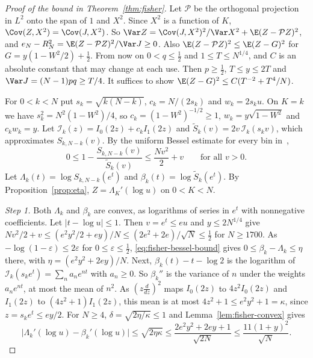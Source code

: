 \begin{proof}[Proof of the bound in Theorem~\ref{thm:fisher}]
Let $\mathcal P$ be the orthogonal projection in $L^2$ onto the span of $1$
and $X^2$. Since $X^2$ is a function of $K$, $\Cov(Z,X^2)=\Cov(J,X^2)$. So
$\Var Z=\Cov(J,X^2)^2/\Var X^2+\E(Z-\mathcal PZ)^2$, and
$e_N-R^2_N=\E(Z-\mathcal PZ)^2/\Var J\ge0$. Also
$\E(Z-\mathcal PZ)^2\le\E(Z-G)^2$ for $G=y(1-W^2/2)+\frac12$. From now on
$0<q\le\frac12$ and $1\le T\le N^{1/4}$, and $C$ is an absolute constant that
may change at each use. Then $p\ge\frac12$, $T\le y\le2T$ and
$\Var J=(N-1)pq\ge T/4$. It suffices to show
$\E(Z-G)^2\le C(T^{-2}+T^4/N)$.

For $0<k<N$ put $s_k=\sqrt{k(N-k)}$, $c_k=N/(2s_k)$ and $w_k=2s_ku$. On
$K=k$ we have $s_k^2=N^2(1-W^2)/4$, so $c_k=(1-W^2)^{-1/2}\ge1$,
$w_k=y\sqrt{1-W^2}$ and $c_kw_k=y$. Let $\mathcal I_k(z)=I_0(2z)+c_kI_1(2z)$
and $\widetilde S_k(v)=2v\,\mathcal I_k(s_kv)$, which approximates
$S_{k,N-k}(v)$. By the uniform Bessel estimate for every
bin in~\cite{paperA},
\begin{equation}\label{eq:fisher-bessel-bound}
 0\le1-\frac{S_{k,N-k}(v)}{\widetilde S_k(v)}\le\frac{Nv^2}2+v
 \qquad\text{for all }v>0 .
\end{equation}
Let $\Lambda_k(t)=\log S_{k,N-k}(e^t)$ and
$\beta_k(t)=\log\widetilde S_k(e^t)$. By Proposition~\ref{prop:eta},
$Z=\Lambda_K'(\log u)$ on $0<K<N$.

\emph{Step 1.} Both $\Lambda_k$ and $\beta_k$ are convex, as logarithms of
series in $e^t$ with nonnegative coefficients. Let $|t-\log
u|\le1$. Then $v=e^t\le eu$ and $y\le2N^{1/4}$ give
$Nv^2/2+v\le(e^2y^2/2+ey)/N\le(2e^2+2e)/\sqrt N\le\frac12$ for $N\ge1700$. As
$-\log(1-\varepsilon)\le2\varepsilon$ for $0\le\varepsilon\le\frac12$,
\eqref{eq:fisher-bessel-bound} gives $0\le\beta_k-\Lambda_k\le\eta$ there,
with $\eta=(e^2y^2+2ey)/N$. Next, $\beta_k(t)-t-\log2$ is the logarithm of
$\mathcal I_k(s_ke^t)=\sum_na_ne^{nt}$ with $a_n\ge0$. So $\beta_k''$ is the
variance of $n$ under the weights $a_ne^{nt}$, at most the mean of $n^2$. As
$(z\frac d{dz})^2$ maps $I_0(2z)$ to $4z^2I_0(2z)$ and $I_1(2z)$ to
$(4z^2+1)I_1(2z)$, this mean is at most $4z^2+1\le e^2y^2+1=\kappa$, since
$z=s_ke^t\le ey/2$. For $N\ge4$,
$\delta=\sqrt{2\eta/\kappa}\le1$ and Lemma~\ref{lem:fisher-convex} gives
\begin{equation}\label{eq:fisher-step1}
 \bigl|\Lambda_k'(\log u)-\beta_k'(\log u)\bigr|
 \le\sqrt{2\eta\kappa}
 \le\frac{2e^2y^2+2ey+1}{\sqrt{2N}}\le\frac{11(1+y)^2}{\sqrt N}.
\end{equation}


\end{proof}
